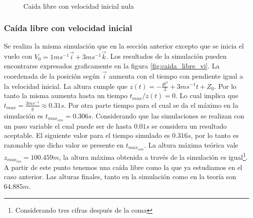 \documentclass[main]{subfiles}
\begin{document}
\begin{figure} [h!]
  \centering
 
  \caption{Caida libre con velocidad inicial nula}
  \label{fig:caida_libre}
\end{figure}

\subsubsection{Ca\'ida libre con velocidad inicial}
Se realiza la misma simulaci\'on que en la secci\'on anterior excepto que se inicia el vuelo con $V_0 = 1ms^{-1}\vec{i}+3ms^{-1}\vec{k}$. Los resultados de la simulaci\'on pueden encontrarse expresados graficamente en la figura \ref{fig:caida_libre_vi}. La coordenada de la posici\'on seg\'un $\vec{i}$ aumenta con el tiempo con pendiente igual a la velocidad inicial. La altura cumple que $z(t)=-\frac{gt^2}{2}+3ms^{-1}t+Z_0$. Por lo tanto la misma aumenta hasta un tiempo  $t_{max} / \dot{z}(t)=0$. Lo cual implica que $t_{max}=\frac{3ms^{-1}}{g}\approx0.31s$. Por otra parte tiempo para el cual se da el m\'aximo en la simulaci\'on es $t_{max_{sim}} = 0.306s$. Considerando que las simulaciones se realizan con un paso variable el cual puede ser de hasta $0.01s$ se considera un resultado aceptable. El siguiente valor para el tiempo simulado es $0.316s$, por lo tanto es razonable que dicho valor se presente en $t_{max_{sim}}$. La altura m\'axima te\'orica vale $z_{max_{teo}}=100.459m$, la altura m\'axima obtenida a trav\'es de la simulaci\'on es igual\footnote{Considerando tres cifras despu\'es de la coma}. A partir de este punto tenemos una ca\'ida libre como la que ya estudiamos en el caso anterior. Las alturas finales, tanto en la simulaci\'on como en la teor\'ia son $64.885m$.
\end{document}
